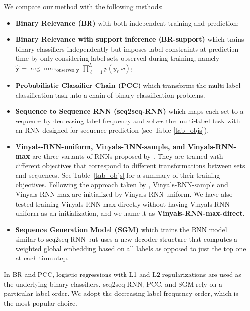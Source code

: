 We compare our method with the following methods: 
\begin{itemize}
	\item \textbf{Binary Relevance (BR)} \cite{tsoumakas2007multi} with both independent training and prediction;
	\item \textbf{Binary Relevance with support inference (BR-support)} \cite{wang2017regularizing} which trains binary classifiers independently but imposes label constraints at prediction time by only considering label sets observed during training, namely $\hat{\mathbf{y}}=\arg\max_{\text{observed~}\mathbf{y}}\prod_{\ell=1}^L p(y_{\ell}|x)$;
	\item \textbf{Probabilistic Classifier Chain (PCC)} \cite{DBLP:conf/icml/DembczynskiCH10} which transforms the multi-label classification task into a chain of binary classification problems.
    \item \textbf{Sequence to Sequence RNN (seq2seq-RNN)} \cite{DBLP:conf/nips/NamMKF17} which maps each set to a sequence by decreasing label frequency and solves the multi-label task with an RNN designed for sequence prediction (see Table \ref{tab_objs}). 
    \item \textbf{Vinyals-RNN-uniform, Vinyals-RNN-sample, and Vinyals-RNN-max} are three variants of RNNs proposed by \cite{vinyals2015order}. They are trained  with different objectives that correspond to different transformations between sets and sequences. See Table~\ref{tab_objs} for a summary of their training objectives. Following the approach taken by \cite{vinyals2015order}, Vinyals-RNN-sample and Vinyals-RNN-max are initialized by Vinyals-RNN-uniform. We have also tested training Vinyals-RNN-max directly without having Vinyals-RNN-uniform as an initialization, and we name it as  \textbf{Vinyals-RNN-max-direct}.
    \item \textbf{Sequence Generation Model (SGM)} \cite{DBLP:journals/corr/abs-1806-04822} which trains the RNN model similar to seq2seq-RNN but uses a new decoder structure that computes a weighted global embedding based on all labels as opposed to just the top one at each time step.
\end{itemize}

In BR and PCC, logistic regressions with L1 and L2 regularizations are used as the underlying binary classifiers. seq2seq-RNN, PCC, and SGM rely on a particular label order. We adopt the decreasing label frequency order, which is the most popular choice.


